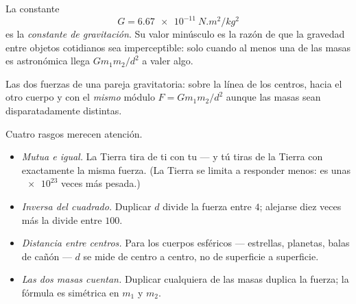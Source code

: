 \begin{definition}\label{def:g10:universal-gravitation:constant}
La constante
\[
G = \qty{6.67e-11}{N.m^2/kg^2}
\]
es la \emph{constante de gravitación}.
Su valor minúsculo es la razón de que la gravedad entre objetos
cotidianos sea imperceptible: solo cuando al menos una de las masas es
astronómica llega $G m_1 m_2 / d^2$ a valer algo.
\end{definition}

\begin{omfigure}

{\small Las dos fuerzas de una pareja gravitatoria: sobre la línea de
los centros, hacia el otro cuerpo y con el \emph{mismo} módulo
$F = G m_1 m_2 / d^2$ aunque las masas sean disparatadamente
distintas.}
\end{omfigure}

\begin{remark}\label{rem:g10:universal-gravitation:reading}
Cuatro rasgos merecen atención.
\begin{itemize}
  \item \emph{Mutua e igual.} La Tierra tira de ti con tu  --- y tú
        tiras de la Tierra con exactamente la misma fuerza. (La Tierra
        se limita a responder menos: es unas $\num{e23}$ veces más
        pesada.)
  \item \emph{Inversa del cuadrado.} Duplicar $d$ divide la fuerza entre
        $4$; alejarse diez veces más la divide entre $100$.
  \item \emph{Distancia entre centros.} Para los cuerpos esféricos ---
        estrellas, planetas, balas de cañón --- $d$ se mide de centro a
        centro, no de superficie a superficie.
  \item \emph{Las dos masas cuentan.} Duplicar cualquiera de las masas
        duplica la fuerza; la fórmula es simétrica en $m_1$ y $m_2$.
\end{itemize}
\end{remark}

